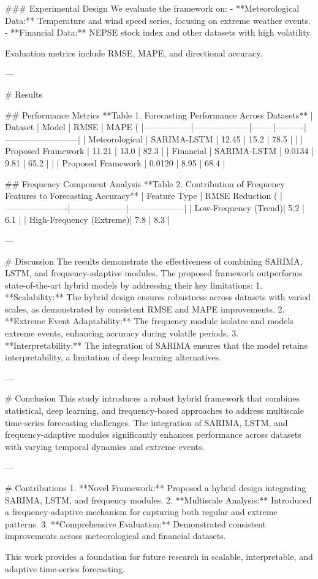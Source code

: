 ### Experimental Design  
We evaluate the framework on:  
- **Meteorological Data:** Temperature and wind speed series, focusing on extreme weather events.  
- **Financial Data:** NEPSE stock index and other datasets with high volatility.  

Evaluation metrics include RMSE, MAPE, and directional accuracy.  

---

# Results  

## Performance Metrics  
**Table 1. Forecasting Performance Across Datasets**  
| Dataset         | Model              | RMSE   | MAPE (%
|-----------------|--------------------|--------|----------|--------------------------|  
| Meteorological  | SARIMA-LSTM       | 12.45  | 15.2     | 78.5                     |  
|                 | Proposed Framework | 11.21  | 13.0     | 82.3                     |  
| Financial       | SARIMA-LSTM       | 0.0134 | 9.81     | 65.2                     |  
|                 | Proposed Framework | 0.0120 | 8.95     | 68.4                     |  

## Frequency Component Analysis  
**Table 2. Contribution of Frequency Features to Forecasting Accuracy**  
| Feature Type         | RMSE Reduction (%
|----------------------|--------------------|--------------------|  
| Low-Frequency (Trend)| 5.2                | 6.1                |  
| High-Frequency (Extreme)| 7.8             | 8.3                |  

---

# Discussion  
The results demonstrate the effectiveness of combining SARIMA, LSTM, and frequency-adaptive modules. The proposed framework outperforms state-of-the-art hybrid models by addressing their key limitations:  
1. **Scalability:** The hybrid design ensures robustness across datasets with varied scales, as demonstrated by consistent RMSE and MAPE improvements.  
2. **Extreme Event Adaptability:** The frequency module isolates and models extreme events, enhancing accuracy during volatile periods.  
3. **Interpretability:** The integration of SARIMA ensures that the model retains interpretability, a limitation of deep learning alternatives.  

---

# Conclusion  
This study introduces a robust hybrid framework that combines statistical, deep learning, and frequency-based approaches to address multiscale time-series forecasting challenges. The integration of SARIMA, LSTM, and frequency-adaptive modules significantly enhances performance across datasets with varying temporal dynamics and extreme events.  

---

# Contributions  
1. **Novel Framework:** Proposed a hybrid design integrating SARIMA, LSTM, and frequency modules.  
2. **Multiscale Analysis:** Introduced a frequency-adaptive mechanism for capturing both regular and extreme patterns.  
3. **Comprehensive Evaluation:** Demonstrated consistent improvements across meteorological and financial datasets.  

This work provides a foundation for future research in scalable, interpretable, and adaptive time-series forecasting.  